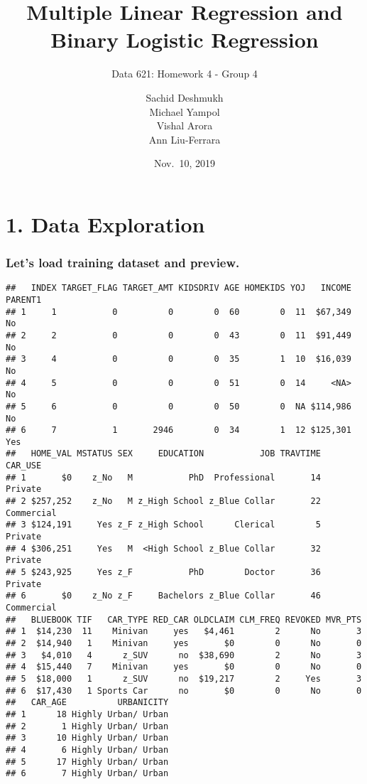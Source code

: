 \documentclass[]{article}
\title{Multiple Linear Regression and Binary Logistic Regression}
\subtitle{Data 621: Homework 4 - Group 4}
\author{Sachid Deshmukh \\ Michael Yampol \\ Vishal Arora \\ Ann Liu-Ferrara}
\date{Nov.~10, 2019}
\begin{document}
\maketitle

{
\setcounter{tocdepth}{2}
\tableofcontents
}
\newpage

\hypertarget{data-exploration}{%
\section{1. Data Exploration}\label{data-exploration}}

\hypertarget{lets-load-training-dataset-and-preview.}{%
\subsubsection{\texorpdfstring{\textbf{Let's load training dataset and
preview.}}{Let's load training dataset and preview.}}\label{lets-load-training-dataset-and-preview.}}

\begin{verbatim}
##   INDEX TARGET_FLAG TARGET_AMT KIDSDRIV AGE HOMEKIDS YOJ   INCOME PARENT1
## 1     1           0          0        0  60        0  11  $67,349      No
## 2     2           0          0        0  43        0  11  $91,449      No
## 3     4           0          0        0  35        1  10  $16,039      No
## 4     5           0          0        0  51        0  14     <NA>      No
## 5     6           0          0        0  50        0  NA $114,986      No
## 6     7           1       2946        0  34        1  12 $125,301     Yes
##   HOME_VAL MSTATUS SEX     EDUCATION           JOB TRAVTIME    CAR_USE
## 1       $0    z_No   M           PhD  Professional       14    Private
## 2 $257,252    z_No   M z_High School z_Blue Collar       22 Commercial
## 3 $124,191     Yes z_F z_High School      Clerical        5    Private
## 4 $306,251     Yes   M  <High School z_Blue Collar       32    Private
## 5 $243,925     Yes z_F           PhD        Doctor       36    Private
## 6       $0    z_No z_F     Bachelors z_Blue Collar       46 Commercial
##   BLUEBOOK TIF   CAR_TYPE RED_CAR OLDCLAIM CLM_FREQ REVOKED MVR_PTS
## 1  $14,230  11    Minivan     yes   $4,461        2      No       3
## 2  $14,940   1    Minivan     yes       $0        0      No       0
## 3   $4,010   4      z_SUV      no  $38,690        2      No       3
## 4  $15,440   7    Minivan     yes       $0        0      No       0
## 5  $18,000   1      z_SUV      no  $19,217        2     Yes       3
## 6  $17,430   1 Sports Car      no       $0        0      No       0
##   CAR_AGE          URBANICITY
## 1      18 Highly Urban/ Urban
## 2       1 Highly Urban/ Urban
## 3      10 Highly Urban/ Urban
## 4       6 Highly Urban/ Urban
## 5      17 Highly Urban/ Urban
## 6       7 Highly Urban/ Urban
\end{verbatim}
\end{document}
